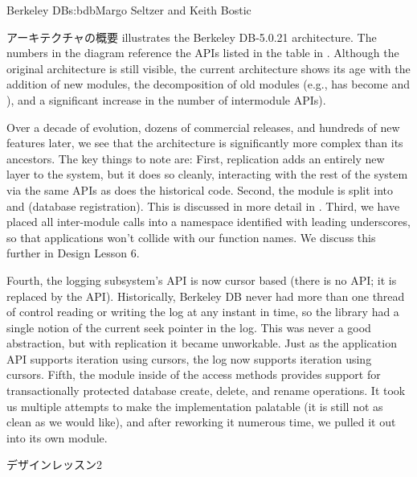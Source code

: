 \begin{aosachapter}{Berkeley DB}{s:bdb}{Margo Seltzer and Keith Bostic}
\begin{aosasect1}{アーキテクチャの概要}
 illustrates the Berkeley DB-5.0.21
architecture.  The numbers in the diagram reference the APIs listed
in the table in . Although the original
architecture is still visible, the current architecture shows its age
with the addition of new modules, the decomposition of old modules
(e.g.,  has become  and ), and a 
significant increase in
the number of intermodule APIs).

Over a decade of evolution, dozens of commercial releases, and
hundreds of new features later, we see that the architecture is
significantly more complex than its ancestors.  The key things to note
are: First, replication adds an entirely new layer to the system, but
it does so cleanly, interacting with the rest of the system via the
same APIs as does the historical code.  Second, the  module is
split into  and  (database registration).  This is discussed
in more detail in .  Third, we have placed all
inter-module calls into a namespace identified with leading
underscores, so that applications won't collide with our function
names. We discuss this further in Design Lesson 6.

Fourth, the logging subsystem's API is now cursor based (there is no
 API; it is replaced by the  API).
Historically, Berkeley DB never had more than one thread of control
reading or writing the log at any instant in time, so the library had
a single notion of the current seek pointer in the log.  This was
never a good abstraction, but with replication it became
unworkable. Just as the application API supports iteration using
cursors, the log now supports iteration using cursors.  Fifth, the
 module inside of the access methods provides support for
transactionally protected database create, delete, and rename
operations. It took us multiple attempts to make the implementation
palatable (it is still not as clean as we would like), and after
reworking it numerous time, we pulled it out into its own module. 

\begin{aosabox}{デザインレッスン2}


\end{aosabox}
\end{aosasect1}
\end{aosachapter}
